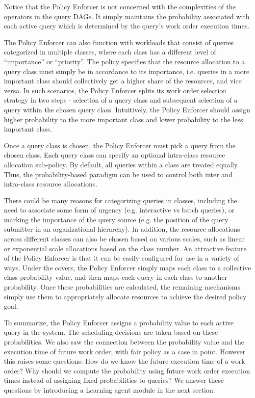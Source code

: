 Notice that the Policy Enforcer is not concerned with the complexities of the operators in the query DAGs. 
It simply maintains the probability associated with each active query which is determined by the query's %
work order execution times.

The Policy Enforcer can also function with workloads that consist of queries categorized in multiple classes, where each class has a different level of ``importance'' or ``priority''. 
The policy specifies that the resource allocation to a query class must simply be in accordance to its importance, i.e. queries in a more important class should collectively get a higher share of the resources, and vice versa.
In such scenarios, the Policy Enforcer splits its work order selection strategy in two steps - selection of a query class and subsequent selection of a 
query within the chosen query class.
Intuitively, the Policy Enforcer should assign higher probability to the more 
important class and lower probability to the less important class.

Once a query class is chosen, the Policy Enforcer must pick a query from the chosen class. 
Each query class can specify an optional intra-class resource allocation sub-policy. 
By default, all queries within a class are treated equally.
Thus, the probability-based paradigm can be used to control both inter and intra-class resource allocations.

There could be many reasons for categorizing queries in classes, including the need to associate some form of urgency (e.g. interactive vs batch queries), or marking the importance of the query source 
(e.g. the position of the query submitter in an organizational hierarchy). 
In addition, the resource allocations across different classes can also be chosen based on various scales, such as linear or exponential scale allocations based on the class number. 
An attractive feature of the Policy Enforcer is that it can be easily configured for use in a variety of ways.
Under the covers, the Policy Enforcer simply maps each class to a collective class probability value, and then maps each query in each class to another probability. 
Once these probabilities are calculated, the remaining mechanisms simply use them to appropriately allocate resources to achieve the desired policy goal.

To summarize, the Policy Enforcer assigns a probability value to each active query in the system. 
The scheduling decisions are taken based on these probabilities. 
We also saw the connection between the probability value and the execution time of future work order, with fair policy as a case in point. 
However this raises some questions: How do we know the future execution time of a work order? 
Why should we compute the probability using future work order execution times instead of assigning fixed probabilities to queries?
We answer these questions by introducing a Learning agent module in the next section. 
 
